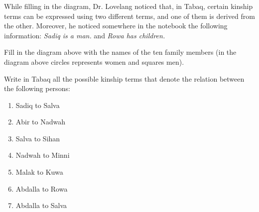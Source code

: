 \begin{refsection}
\begin{problem}{\langnameTabaq}{\nameDMirea}{}
\begin{multicols}{2}
\begin{description}[font=\normalfont,leftmargin=!,labelwidth={\widthof{Nadwah:}}]
    \item[Sadiq:]  \\  \\ 
    
    \item[Minni:]  \\  \\ 
    
    \item[Nadwah:]  \\  \\ 
    
    \item[Abir:]  \\  \\ 
    
    \item[Abdalla:]  \\  \\ 
\end{description}
\end{multicols}

While filling in the diagram, Dr. Lovelang noticed that, in Tabaq, certain kinship terms can be expressed using two different terms, and one of them is derived from the other. Moreover, he noticed somewhere in the notebook the following information: \textit{Sadiq is a man.} and \textit{Rowa has children.}

\begin{assgts}
\multicolsep=3pt\largerpage[2.5]
\item Fill in the diagram above with the names of the ten family members (in the diagram above circles represents women and squares men). 
\item Write in Tabaq all the possible kinship terms that denote the relation between the following persons:

\begin{multicols}{2}\raggedcolumns
\begin{enumerate}[label = \alph*.]
    \item Sadiq to Salva 
    \item Abir to Nadwah
    \item Salva to Sihan
    \item Nadwah to Minni\columnbreak
    \item Malak to Kuwa
    \item Abdalla to Rowa
    \item Abdalla to Salva
\end{enumerate}
\end{multicols}


\end{assgts}
\end{problem}
\end{refsection}
